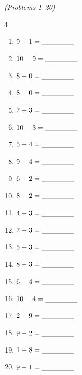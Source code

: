 \documentclass[12pt, letterpaper]{article}
\begin{document}
\bigskip
{} \hfill \textit{(Problems 1–20)}

\bigskip
\begin{multicols}{4}
\begin{enumerate}[leftmargin=*,label=\textbf{\arabic*.},itemsep=9pt]
  \item $9+1=\underline{\hspace{1.6cm}}$
  \item $10-9=\underline{\hspace{1.6cm}}$
  \item $8+0=\underline{\hspace{1.6cm}}$
  \item $8-0=\underline{\hspace{1.6cm}}$
  \item $7+3=\underline{\hspace{1.6cm}}$
  \item $10-3=\underline{\hspace{1.6cm}}$
  \item $5+4=\underline{\hspace{1.6cm}}$
  \item $9-4=\underline{\hspace{1.6cm}}$
  \item $6+2=\underline{\hspace{1.6cm}}$
  \item $8-2=\underline{\hspace{1.6cm}}$
  \item $4+3=\underline{\hspace{1.6cm}}$
  \item $7-3=\underline{\hspace{1.6cm}}$
  \item $5+3=\underline{\hspace{1.6cm}}$
  \item $8-3=\underline{\hspace{1.6cm}}$
  \item $6+4=\underline{\hspace{1.6cm}}$
  \item $10-4=\underline{\hspace{1.6cm}}$
  \item $2+9=\underline{\hspace{1.6cm}}$
  \item $9-2=\underline{\hspace{1.6cm}}$
  \item $1+8=\underline{\hspace{1.6cm}}$
  \item $9-1=\underline{\hspace{1.6cm}}$
\end{enumerate}
\end{multicols}
\end{document}
